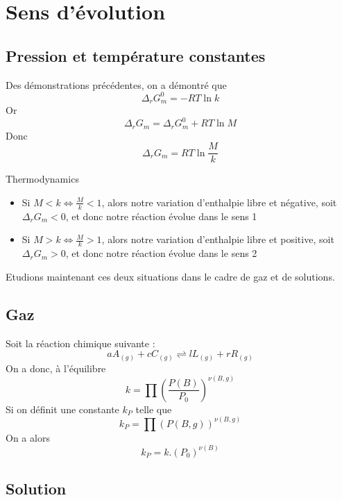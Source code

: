 \section{Sens d'évolution}

\subsection{Pression et température constantes}

Des démonstrations précédentes, on a démontré que 
$$\Delta_rG_m^0=-RT\ln k$$
Or
$$\Delta_rG_m = \Delta_rG_m^0+RT\ln M $$
Donc
\begin{equation}
\Delta_rG_m= RT\ln \frac {M}{k}
\end{equation}

\begin{proposition}
{\small{\color{white}Thermodynamics}}
\begin{itemize}
\item Si $M<k \Leftrightarrow \frac{M}{k}<1$, alors notre variation d'enthalpie libre et négative, soit $\Delta_rG_m<0$, et donc notre réaction évolue dans le sens 1
\item Si $M>k \Leftrightarrow \frac{M}{k}>1$, alors notre variation d'enthalpie libre et positive, soit $\Delta_rG_m>0$, et donc notre réaction évolue dans le sens 2
\end{itemize}
\end{proposition}

Etudions maintenant ces deux situations dans le cadre de gaz et de solutions.

\subsection{Gaz}
Soit la réaction chimique suivante :
$$aA_{(g)}+cC_{(g)} \rightleftharpoons lL_{(g)}+rR_{(g)}$$
On a donc, à l'équilibre
\begin{equation}
k=\prod \left ( \frac{P(B)}{P_0}\right )^{\nu(B, g)}
\end{equation}
Si on définit une constante $k_P$ telle que
\begin{equation}
k_P=\prod \left ( P(B,g)\right ) ^{\nu(B,g)}
\end{equation}
On a alors
\begin{equation}
k_P=k.(P_0)^{\nu(B)}
\end{equation}

\subsection{Solution}

